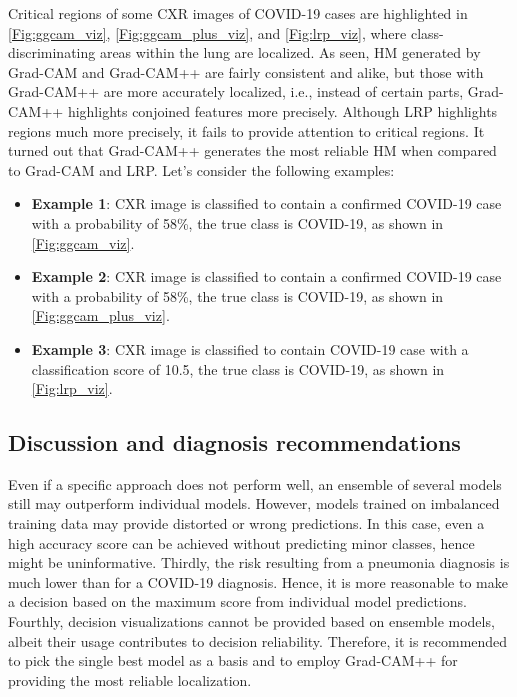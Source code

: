 \documentclass[conference]{IEEEtran}
\begin{document}
Critical regions of some CXR images of COVID-19 cases are highlighted in \cref{Fig:ggcam_viz}, \cref{Fig:ggcam_plus_viz}, and \cref{Fig:lrp_viz}, where class-discriminating areas within the lung are localized.
As seen, HM generated by Grad-CAM and Grad-CAM++ are fairly consistent and alike, but those with Grad-CAM++ are more accurately localized, i.e., instead of certain parts, Grad-CAM++ highlights conjoined features more precisely.
Although LRP highlights regions much more precisely, it fails to provide attention to critical regions. It turned out that Grad-CAM++ generates the most reliable HM when compared to Grad-CAM and LRP. Let's consider the following examples: 

\begin{itemize}
    \item \textbf{Example 1}: CXR image is classified to contain a confirmed COVID-19 case with a probability of 58\%, the true class is COVID-19, as shown in \cref{Fig:ggcam_viz}. 
    \item \textbf{Example 2}: CXR image is classified to contain a confirmed COVID-19 case with a probability of 58\%, the true class is COVID-19, as shown in \cref{Fig:ggcam_plus_viz}. 
    \item \textbf{Example 3}: CXR image is classified to contain COVID-19 case with a classification score of 10.5, the true class is COVID-19, as shown in \cref{Fig:lrp_viz}.
\end{itemize}

\subsection{Discussion and diagnosis recommendations}
Even if a specific approach does not perform well, an ensemble of several models still may outperform individual models. However, models trained on imbalanced training data may provide distorted or wrong predictions. In this case, even a high accuracy score can be achieved without predicting minor classes, hence might be uninformative. 
Thirdly, the risk resulting from a pneumonia diagnosis is much lower than for a COVID-19 diagnosis. Hence, it is more reasonable to make a decision based on the maximum score from individual model predictions. Fourthly, decision visualizations cannot be provided based on ensemble models, albeit their usage contributes to decision reliability. Therefore, it is recommended to pick the single best model as a basis and to employ Grad-CAM++ for providing the most reliable localization. 
\end{document}
